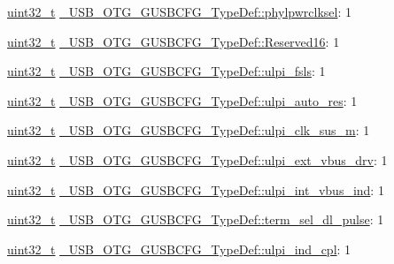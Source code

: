 \begin{DoxyCompactItemize}
\item 
\hyperlink{stdint_8h_a435d1572bf3f880d55459d9805097f62}{uint32\-\_\-t} \hyperlink{group___u_s_b___o_t_g___d_r_i_v_e_r_ga5b4ca996d79eeaf720a45ea5556ffb56}{\-\_\-\-U\-S\-B\-\_\-\-O\-T\-G\-\_\-\-G\-U\-S\-B\-C\-F\-G\-\_\-\-Type\-Def\-::phylpwrclksel}\-: 1
\item 
\hyperlink{stdint_8h_a435d1572bf3f880d55459d9805097f62}{uint32\-\_\-t} \hyperlink{group___u_s_b___o_t_g___d_r_i_v_e_r_ga88cd3b51dbbb01de8dcb247f6b63fe5a}{\-\_\-\-U\-S\-B\-\_\-\-O\-T\-G\-\_\-\-G\-U\-S\-B\-C\-F\-G\-\_\-\-Type\-Def\-::\-Reserved16}\-: 1
\item 
\hyperlink{stdint_8h_a435d1572bf3f880d55459d9805097f62}{uint32\-\_\-t} \hyperlink{group___u_s_b___o_t_g___d_r_i_v_e_r_ga11c23bdbb96fbbd770e234418b23ee98}{\-\_\-\-U\-S\-B\-\_\-\-O\-T\-G\-\_\-\-G\-U\-S\-B\-C\-F\-G\-\_\-\-Type\-Def\-::ulpi\-\_\-fsls}\-: 1
\item 
\hyperlink{stdint_8h_a435d1572bf3f880d55459d9805097f62}{uint32\-\_\-t} \hyperlink{group___u_s_b___o_t_g___d_r_i_v_e_r_ga7eac0fd686a7c2a5fb6806f37eb05c15}{\-\_\-\-U\-S\-B\-\_\-\-O\-T\-G\-\_\-\-G\-U\-S\-B\-C\-F\-G\-\_\-\-Type\-Def\-::ulpi\-\_\-auto\-\_\-res}\-: 1
\item 
\hyperlink{stdint_8h_a435d1572bf3f880d55459d9805097f62}{uint32\-\_\-t} \hyperlink{group___u_s_b___o_t_g___d_r_i_v_e_r_ga35f46a6ff5f51fdda610b5055f6a39ae}{\-\_\-\-U\-S\-B\-\_\-\-O\-T\-G\-\_\-\-G\-U\-S\-B\-C\-F\-G\-\_\-\-Type\-Def\-::ulpi\-\_\-clk\-\_\-sus\-\_\-m}\-: 1
\item 
\hyperlink{stdint_8h_a435d1572bf3f880d55459d9805097f62}{uint32\-\_\-t} \hyperlink{group___u_s_b___o_t_g___d_r_i_v_e_r_gaa070eb75a66b50333067bfe225743a63}{\-\_\-\-U\-S\-B\-\_\-\-O\-T\-G\-\_\-\-G\-U\-S\-B\-C\-F\-G\-\_\-\-Type\-Def\-::ulpi\-\_\-ext\-\_\-vbus\-\_\-drv}\-: 1
\item 
\hyperlink{stdint_8h_a435d1572bf3f880d55459d9805097f62}{uint32\-\_\-t} \hyperlink{group___u_s_b___o_t_g___d_r_i_v_e_r_gaf0906a4f08d2d62892a725f8cac7ea1e}{\-\_\-\-U\-S\-B\-\_\-\-O\-T\-G\-\_\-\-G\-U\-S\-B\-C\-F\-G\-\_\-\-Type\-Def\-::ulpi\-\_\-int\-\_\-vbus\-\_\-ind}\-: 1
\item 
\hyperlink{stdint_8h_a435d1572bf3f880d55459d9805097f62}{uint32\-\_\-t} \hyperlink{group___u_s_b___o_t_g___d_r_i_v_e_r_ga43abde119cd03b43bdf9e7b17592c746}{\-\_\-\-U\-S\-B\-\_\-\-O\-T\-G\-\_\-\-G\-U\-S\-B\-C\-F\-G\-\_\-\-Type\-Def\-::term\-\_\-sel\-\_\-dl\-\_\-pulse}\-: 1
\item 
\hyperlink{stdint_8h_a435d1572bf3f880d55459d9805097f62}{uint32\-\_\-t} \hyperlink{group___u_s_b___o_t_g___d_r_i_v_e_r_gafb061f37737372a6b6d9576a9b34585b}{\-\_\-\-U\-S\-B\-\_\-\-O\-T\-G\-\_\-\-G\-U\-S\-B\-C\-F\-G\-\_\-\-Type\-Def\-::ulpi\-\_\-ind\-\_\-cpl}\-: 1

\end{DoxyCompactItemize}
